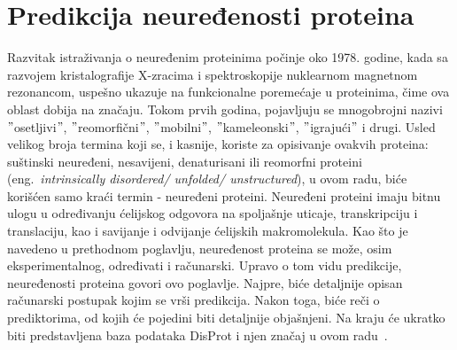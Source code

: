 
\chapter{Predikcija neuređenosti proteina} %
\label{predikcija} %

Razvitak istraživanja o neuređenim proteinima počinje oko 1978. godine, kada sa razvojem kristalografije X-zracima i spektroskopije nuklearnom magnetnom rezonancom, uspešno ukazuje na funkcionalne poremećaje u proteinima, čime ova oblast dobija na značaju. Tokom prvih godina, pojavljuju se mnogobrojni nazivi $"$osetljivi$"$, $"$reomorfični$"$, $"$mobilni$"$, $"$kameleonski$"$, $"$igrajući$"$ i drugi. Usled velikog broja termina koji se, i kasnije, koriste za opisivanje ovakvih proteina: suštinski neuređeni, nesavijeni, denaturisani ili reomorfni proteini (eng.~{\em intrinsically disordered/ unfolded/ unstructured}), u ovom radu, biće korišćen samo kraći termin - neuređeni proteini. 
Neuređeni proteini imaju bitnu ulogu u određivanju ćelijskog odgovora na spoljašnje uticaje, transkripciju i translaciju, kao i savijanje i odvijanje ćelijskih makromolekula.
Kao što je navedeno u prethodnom poglavlju, neuređenost proteina se može, osim eksperimentalnog, određivati i računarski. Upravo o tom vidu predikcije, neuređenosti proteina govori ovo poglavlje. Najpre, biće detaljnije opisan računarski postupak kojim se vrši predikcija. Nakon toga, biće reči o prediktorima, od kojih će pojedini biti detaljnije objašnjeni. Na kraju će ukratko  biti predstavljena baza podataka DisProt i njen značaj u ovom radu~\cite{JKd, IDPsAtoZ, IDPTompa}.\\\\



